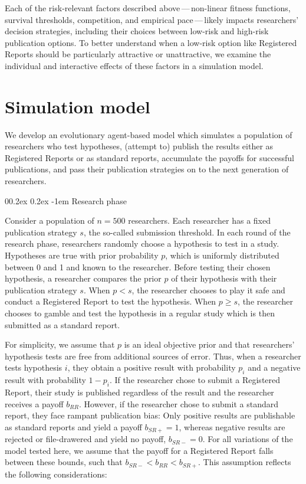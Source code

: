 \documentclass[
  ,man,mask,floatsintext]{apa6}
\makeatletter
\let\oldparagraph\paragraph
\renewcommand{\paragraph}[1]{\oldparagraph{#1}\mbox{}}
\renewcommand{\paragraph}{\@startsection{paragraph}{4}{\parindent}%
  {0\baselineskip \@plus 0.2ex \@minus 0.2ex}%
  {-1em}%
  {\normalfont\normalsize\bfseries\itshape\typesectitle}}
\makeatother
\begin{document}
Each of the risk-relevant factors described above\(\,\)---\(\,\)non-linear fitness functions, survival thresholds, competition, and empirical pace\(\,\)---\(\,\)likely impacts researchers' decision strategies, including their choices between low-risk and high-risk publication options.
To better understand when a low-risk option like Registered Reports should be particularly attractive or unattractive, we examine the individual and interactive effects of these factors in a simulation model.

\hypertarget{simulation-model}{%
\section{Simulation model}\label{simulation-model}}

We develop an evolutionary agent-based model which simulates a population of researchers who test hypotheses, (attempt to) publish the results either as Registered Reports or as standard reports, accumulate the payoffs for successful publications, and pass their publication strategies on to the next generation of researchers.

\hypertarget{research-phase}{%
\paragraph{Research phase}\label{research-phase}}

Consider a population of \(n = 500\) researchers.
Each researcher has a fixed publication strategy \(s\), the so-called submission threshold.
In each round of the research phase, researchers randomly choose a hypothesis to test in a study.
Hypotheses are true with prior probability \(p\), which is uniformly distributed between 0 and 1 and known to the researcher.
Before testing their chosen hypothesis, a researcher compares the prior \(p\) of their hypothesis with their publication strategy \(s\).
When \(p < s\), the researcher chooses to play it safe and conduct a Registered Report to test the hypothesis.
When \(p \geq s\), the researcher chooses to gamble and test the hypothesis in a regular study which is then submitted as a standard report.

For simplicity, we assume that \(p\) is an ideal objective prior and that researchers' hypothesis tests are free from additional sources of error.
Thus, when a researcher tests hypothesis \(i\), they obtain a positive result with probability \(p_i\) and a negative result with probability \(1-p_i\).
If the researcher chose to submit a Registered Report, their study is published regardless of the result and the researcher receives a payoff \(b_{RR}\).
However, if the researcher chose to submit a standard report, they face rampant publication bias:
Only positive results are publishable as standard reports and yield a payoff \(b_{SR+} = 1\), whereas negative results are rejected or file-drawered and yield no payoff, \(b_{SR-} = 0\).
For all variations of the model tested here, we assume that the payoff for a Registered Report falls between these bounds, such that \(b_{SR-} < b_{RR} < b_{SR+}\).
This assumption reflects the following considerations:
\end{document}
